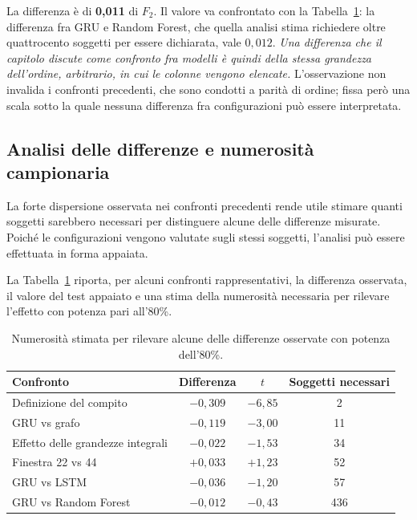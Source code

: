 La differenza è di \textbf{0,011} di $F_2$. Il valore va confrontato con la Tabella~\ref{tab:numerosita}: la differenza fra GRU e Random Forest, che quella analisi stima richiedere oltre quattrocento soggetti per essere dichiarata, vale $0{,}012$. \emph{Una differenza che il capitolo discute come confronto fra modelli è quindi della stessa grandezza dell'ordine, arbitrario, in cui le colonne vengono elencate.} L'osservazione non invalida i confronti precedenti, che sono condotti a parità di ordine; fissa però una scala sotto la quale nessuna differenza fra configurazioni può essere interpretata.

\subsection{Analisi delle differenze e numerosità campionaria}
\label{sec:numerosita}

La forte dispersione osservata nei confronti precedenti rende utile stimare quanti soggetti sarebbero necessari per distinguere alcune delle differenze misurate. Poiché le configurazioni vengono valutate sugli stessi soggetti, l'analisi può essere effettuata in forma appaiata.

La Tabella~\ref{tab:numerosita} riporta, per alcuni confronti rappresentativi, la differenza osservata, il valore del test appaiato e una stima della numerosità necessaria per rilevare l'effetto con potenza pari all'80\%.

\begin{table}[ht]
\centering
\caption{Numerosità stimata per rilevare alcune delle differenze osservate con
potenza dell'80\%.}
\label{tab:numerosita}
\begin{tabular}{lccc}
\toprule
\textbf{Confronto} & \textbf{Differenza} &
\textbf{$t$} & \textbf{Soggetti necessari} \\
\midrule
Definizione del compito & $-0{,}309$ & $-6{,}85$ & 2 \\
GRU vs grafo & $-0{,}119$ & $-3{,}00$ & 11 \\
Effetto delle grandezze integrali & $-0{,}022$ & $-1{,}53$ & 34 \\
Finestra 22 vs 44 & $+0{,}033$ & $+1{,}23$ & 52 \\
GRU vs LSTM & $-0{,}036$ & $-1{,}20$ & 57 \\
GRU vs Random Forest & $-0{,}012$ & $-0{,}43$ & 436 \\
\bottomrule
\end{tabular}
\end{table}

